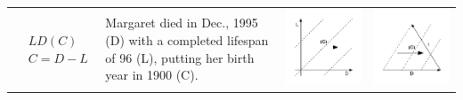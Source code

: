 \documentclass[12pt,oneside,letter]{article} %
\begin{document}
\begin{center}
\begin{longtable}{m{}m{}m{}m{}}
  \midrule
  $$\begin{aligned}
    &LD(C) \\
    &C = D - L
  \end{aligned}$$ &
  Margaret died in Dec., 1995 (D) with a completed lifespan of 96 (L), putting
  her birth year in 1900 (C). &
  \includegraphics[width = \linewidth]{Figures/JonasTable/LDc.pdf} & 
  \includegraphics[width = \linewidth]{Figures/JonasTable/LDc_iso.pdf}  \\

\end{longtable}
\end{center}
\end{document}
